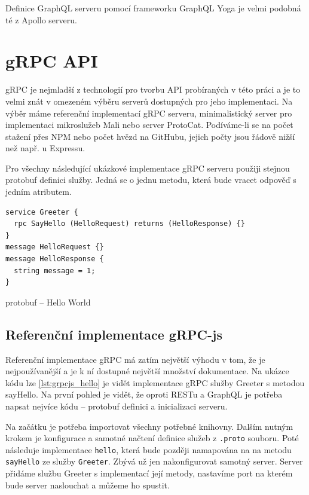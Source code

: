 \documentclass[thesis=M,czech]{FITthesis}[2019/12/23]
\begin{document}
Definice GraphQL serveru pomocí frameworku GraphQL Yoga je velmi podobná té z Apollo serveru.
\clearpage

\section{gRPC API}
gRPC je nejmladší z technologií pro tvorbu API probíraných v této práci a je to velmi znát v omezeném výběru serverů dostupných pro jeho implementaci. Na výběr máme referenční implementací gRPC serveru, minimalistický server pro implementaci mikroslužeb Mali nebo server ProtoCat. Podíváme-li se na počet stažení přes NPM nebo počet hvězd na GitHubu, jejich počty jsou řádově nižší než např. u Expressu.

Pro všechny následující ukázkové implementace gRPC serveru použiji stejnou protobuf definici služby. Jedná se o jednu metodu, která bude vracet odpověď s jedním atributem.

\begin{listing}[h]
\begin{verbatim}
service Greeter {
  rpc SayHello (HelloRequest) returns (HelloResponse) {}
}
message HelloRequest {}
message HelloResponse {
  string message = 1;
}
\end{verbatim}
\caption{protobuf -- Hello World}
\label{lst:protobuf_hello}
\end{listing}

\subsection*{Referenční implementace gRPC-js}
Referenční implementace gRPC má zatím největší výhodu v tom, že je nejpoužívanější a je k ní dostupné největší množství dokumentace.
Na ukázce kódu lze \ref{lst:grpcjs_hello} je vidět implementace gRPC služby Greeter s metodou sayHello. Na první pohled je vidět, že oproti RESTu a GraphQL je potřeba napsat nejvíce kódu -- protobuf definici a inicializaci serveru.

Na začátku je potřeba importovat všechny potřebné knihovny. Dalším nutným krokem je konfigurace a samotné načtení definice služeb z \texttt{.proto} souboru. Poté následuje implementace \texttt{hello}, která bude později namapována na na metodu \texttt{sayHello} ze služby \texttt{Greeter}. Zbývá už jen nakonfigurovat samotný server. Server přidáme službu Greeter s implementací její metody, nastavíme port na kterém bude server naslouchat a můžeme ho spustit.
\end{document}
